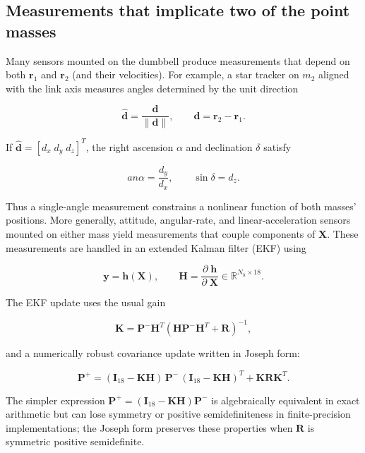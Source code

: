 \documentclass[]{article}
\newcommand{\pd}[2]{\frac{\partial\;#1}{\partial\;#2}}
\begin{document}
	\subsection{Measurements that implicate two of the point masses}

	Many sensors mounted on the dumbbell produce measurements that depend on both $\mathbf{r}_1$ and $\mathbf{r}_2$ (and their velocities). For example, a star tracker on $m_2$ aligned with the link axis measures angles determined by the unit direction

	\begin{equation*}
	\hat{\mathbf{d}} = \frac{\mathbf{d}}{\|\mathbf{d}\|}, \qquad \mathbf{d}=\mathbf{r}_2-\mathbf{r}_1.
	\end{equation*}

	If $\hat{\mathbf{d}}=[d_x\; d_y\; d_z]^T$, the right ascension $\alpha$ and declination $\delta$ satisfy

	\begin{equation*}
		an\alpha = \frac{d_y}{d_x}, \qquad \sin\delta = d_z.
	\end{equation*}

	Thus a single-angle measurement constrains a nonlinear function of both masses' positions. More generally, attitude, angular-rate, and linear-acceleration sensors mounted on either mass yield measurements that couple components of $\mathbf{X}$. These measurements are handled in an extended Kalman filter (EKF) using

	\begin{equation*}
	\mathbf{y}=\mathbf{h}(\mathbf{X}), \qquad \mathbf{H}=\pd{\mathbf{h}}{\mathbf{X}}\in\mathbb{R}^{N_h\times18}.
	\end{equation*}

	The EKF update uses the usual gain

	\begin{equation*}
	\mathbf{K} = \mathbf{P}^- \mathbf{H}^T (\mathbf{H} \mathbf{P}^- \mathbf{H}^T + \mathbf{R})^{-1},
	\end{equation*}

	and a numerically robust covariance update written in Joseph form:

	\begin{equation*}
	\mathbf{P}^+ = (\mathbf{I}_{18} - \mathbf{K}\mathbf{H})\,\mathbf{P}^-\,(\mathbf{I}_{18} - \mathbf{K}\mathbf{H})^T + \mathbf{K}\mathbf{R}\mathbf{K}^T.
	\end{equation*}

	The simpler expression $\mathbf{P}^+=(\mathbf{I}_{18}-\mathbf{K}\mathbf{H})\mathbf{P}^-$ is algebraically equivalent in exact arithmetic but can lose symmetry or positive semidefiniteness in finite-precision implementations; the Joseph form preserves these properties when $\mathbf{R}$ is symmetric positive semidefinite.
\end{document}
